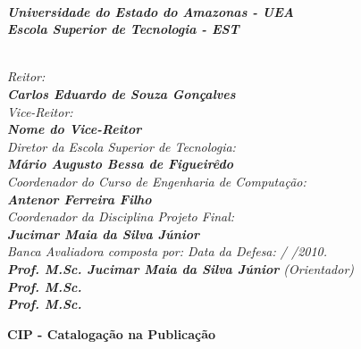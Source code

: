 \documentclass{dcctese}
\begin{document}
\newpage


\textit{\textbf{\\
Universidade do Estado do Amazonas - UEA\\
Escola Superior de Tecnologia - EST}}

\textit{\\
Reitor:\\ 
\textbf{
Carlos Eduardo de Souza Gon\c{c}alves}\\
Vice-Reitor:\\ \textbf{Nome do Vice-Reitor}}
\\
\textit{
Diretor da Escola Superior de Tecnologia:\\ 
\textbf{M\'{a}rio Augusto Bessa de Figueir\^{e}do}}
\\
\textit{
Coordenador do Curso de Engenharia de Computa\c{c}\~{a}o:\\
\textbf{Antenor Ferreira Filho}}
\\
\textit{
Coordenador da Disciplina Projeto Final:\\
\textbf{Jucimar Maia da Silva J\'{u}nior}}
\\[12pt]
\textit{
Banca Avaliadora composta por: \hfill Data da Defesa:  /  /2010.\\
}
\textit{ 
\textbf{Prof. M.Sc. Jucimar Maia da Silva J\'{u}nior} (Orientador)\\
\textbf{Prof. M.Sc. }\\%
\textbf{Prof. M.Sc. }
}

\begin{center}\large \bf CIP - Cataloga\c{c}\~{a}o na Publica\c{c}\~{a}o\end{center}\\
\begin{center}
\end{center}
\end{document}
